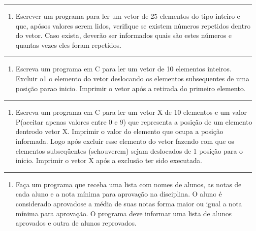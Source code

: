 \documentclass[12pt,a4paper]{article}
\renewcommand{\linethickness}{0.05em}
\providecommand{\tightlist}{%
      \setlength{\itemsep}{0pt}\setlength{\parskip}{0pt}}
\begin{document}
    \begin{center}\rule{0.5\linewidth}{\linethickness}\end{center}

\begin{enumerate}
\def\labelenumi{\arabic{enumi}.}
\setcounter{enumi}{17}
\tightlist
\item
  Escrever um programa para ler um vetor de 25 elementos do tipo inteiro
  e que, apósos valores serem lidos, verifique se existem números
  repetidos dentro do vetor. Caso exista, deverão ser informados quais
  são estes números e quantas vezes eles foram repetidos.
\end{enumerate}

    \begin{center}\rule{0.5\linewidth}{\linethickness}\end{center}

\begin{enumerate}
\def\labelenumi{\arabic{enumi}.}
\setcounter{enumi}{18}
\tightlist
\item
  Escreva um programa em C para ler um vetor de 10 elementos inteiros.
  Excluir o1 o elemento do vetor deslocando os elementos subsequentes de
  uma posição parao inicio. Imprimir o vetor após a retirada do primeiro
  elemento.
\end{enumerate}

    \begin{center}\rule{0.5\linewidth}{\linethickness}\end{center}

\begin{enumerate}
\def\labelenumi{\arabic{enumi}.}
\setcounter{enumi}{19}
\tightlist
\item
  Escreva um programa em C para ler um vetor X de 10 elementos e um
  valor P(aceitar apenas valores entre 0 e 9) que representa a posição
  de um elemento dentrodo vetor X. Imprimir o valor do elemento que
  ocupa a posição informada. Logo após excluir esse elemento do vetor
  fazendo com que os elementos subseqüentes (sehouverem) sejam
  deslocados de 1 posição para o inicio. Imprimir o vetor X após a
  exclusão ter sido executada.
\end{enumerate}

    \begin{center}\rule{0.5\linewidth}{\linethickness}\end{center}

\begin{enumerate}
\def\labelenumi{\arabic{enumi}.}
\setcounter{enumi}{20}
\tightlist
\item
  Faça um programa que receba uma lista com nomes de alunos, as notas de
  cada aluno e a nota mínima para aprovação na disciplina. O aluno é
  considerado aprovadose a média de suas notas forma maior ou igual a
  nota mínima para aprovação. O programa deve informar uma lista de
  alunos aprovados e outra de alunos reprovados.
\end{enumerate}
\end{document}
